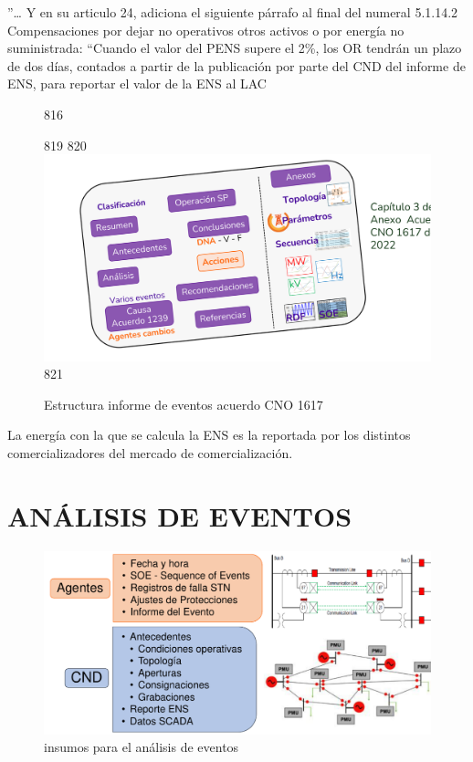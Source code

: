 \documentclass[a5paper]{book}%
\begin{document}
 ”… Y en su articulo 24, adiciona el siguiente párrafo al final del numeral 5.1.14.2 Compensaciones por dejar no operativos otros activos o por energía no suministrada: “Cuando el valor del PENS supere el 2\%, los OR tendrán un plazo de dos días, contados a partir de la publicación por parte del CND del informe de ENS, para reportar el valor de la ENS al LAC
 
\begin{figure}[H]
 816      \caption{Estructura informe de eventos acuerdo CNO 1617}
 819   \label{fig:estructurainforme}
 820   \includegraphics[width=\linewidth]{estructura_informe_eventos1617}
 821 \end{figure}


La energía con la que se calcula la \ac{ENS} es la reportada por los distintos comercializadores del mercado de comercialización.

  \section{ANÁLISIS DE EVENTOS}



\begin{figure}[H]
  \centering
  \caption{insumos para el análisis de eventos}
  \label{fig:insumoseventos}
  \includegraphics[width=0.8\linewidth]{insumos_eventos}
\end{figure}
\end{document}
